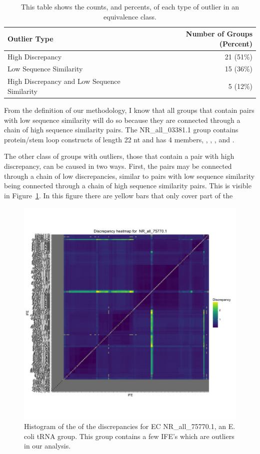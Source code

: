 \begin{table}
  \begin{tabular}{lr}
    \toprule
    Outlier Type & Number of Groups (Percent) \\
    \midrule
    High Discrepancy & 21 (51\%) \\
    Low Sequence Similarity & 15 (36\%) \\
    High Discrepancy and Low Sequence Similarity & 5 (12\%) \\
    \bottomrule
  \end{tabular}
  \caption{This table shows the counts, and percents, of each type of outlier
  in an equivalence class.}
  \label{tab:outlier-types}
\end{table}

From the definition of our methodology, I know that all groups that contain
pairs with low sequence similarity will do so because they are connected through
a chain of high sequence similarity pairs. The NR\_all\_03381.1 group contains
protein/stem loop constructs of length 22 nt and has 4 members,
, , , and .

The other class of groups with outliers, those that contain a pair with high
discrepancy, can be caused in two ways. First, the pairs may be connected
through a chain of low discrepancies, similar to pairs with low sequence
similarity being connected through a chain of high sequence similarity pairs.
This is visible in Figure~\ref{fig:nr-all-75770.1-disc}. In this figure there are
yellow bars that only cover part of the

\begin{figure}[h]
  \includegraphics[width=\linewidth]{chapter-3/figs/nr-all-75770-1-disc}
  \caption{Histogram of the of the discrepancies for EC NR\_all\_75770.1, an E.
    coli tRNA group. This group contains a few IFE's which are outliers in our
  analysis.}
  \label{fig:nr-all-75770.1-disc}
\end{figure}

